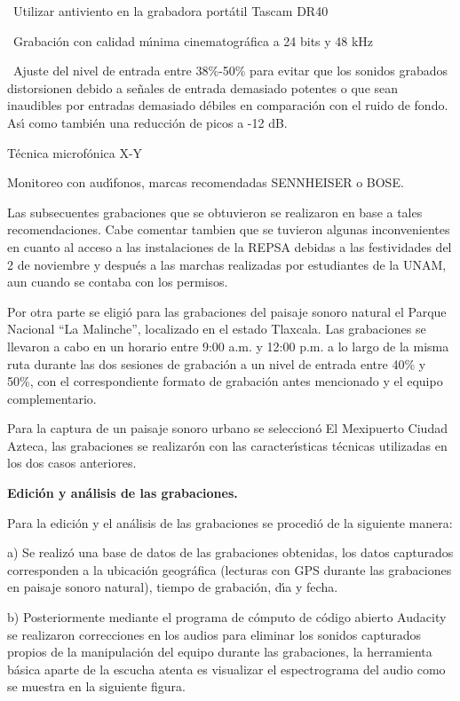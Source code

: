 \textbullet\ Utilizar antiviento en la grabadora port\'{a}til Tascam DR40

\textbullet\ Grabaci\'{o}n con calidad m\'{\i}nima cinematogr\'{a}fica a 24
bits y 48 kHz

\bigskip\textbullet\ Ajuste del nivel de entrada entre 38\%-50\% para evitar
que los sonidos grabados distorsionen debido a se\~{n}ales de entrada
demasiado potentes o que sean inaudibles por entradas demasiado d\'{e}biles en
comparaci\'{o}n con el ruido de fondo. As\'{\i} como tambi\'{e}n una
reducci\'{o}n de picos a -12 dB.

\qquad\textbullet\qquad T\'{e}cnica microf\'{o}nica X-Y

\qquad\textbullet\qquad Monitoreo con aud\'{\i}fonos, marcas recomendadas
SENNHEISER o BOSE.

Las subsecuentes grabaciones que se obtuvieron se realizaron en base a tales
recomendaciones. Cabe comentar tambien que se tuvieron algunas inconvenientes
en cuanto al acceso a las instalaciones de la REPSA debidas a las festividades
del 2 de noviembre y despu\'{e}s a las marchas realizadas por estudiantes de
la UNAM, aun cuando se contaba con los permisos.

Por otra parte se eligi\'{o} para las grabaciones del paisaje sonoro natural
el Parque Nacional \textquotedblleft La Malinche\textquotedblright, localizado
en el estado Tlaxcala. Las grabaciones se llevaron a cabo en un horario entre
9:00 a.m. y 12:00 p.m. a lo largo de la misma ruta durante las dos sesiones de
grabaci\'{o}n a un nivel de entrada entre 40\% y 50\%, con el correspondiente
formato de grabaci\'{o}n antes mencionado y el equipo complementario.

Para la captura de un paisaje sonoro urbano se seleccion\'{o} El Mexipuerto
Ciudad Azteca, las grabaciones se realizar\'{o}n con las caracter\'{\i}sticas
t\'{e}cnicas utilizadas en los dos casos anteriores.

\textbf{ Edici\'{o}n y an\'{a}lisis de las grabaciones.}

Para la edici\'{o}n y el an\'{a}lisis de las grabaciones se procedi\'{o} de la
siguiente manera:

\qquad a) Se realiz\'{o} una base de datos de las grabaciones obtenidas, los
datos capturados corresponden a la ubicaci\'{o}n geogr\'{a}fica (lecturas con
GPS durante las grabaciones en paisaje sonoro natural), tiempo de
grabaci\'{o}n, d\'{\i}a y fecha.

\qquad b) Posteriormente mediante el programa de c\'{o}mputo de c\'{o}digo
abierto Audacity se realizaron correcciones en los audios para eliminar los
sonidos capturados propios de la manipulaci\'{o}n del equipo durante las
grabaciones, la herramienta b\'{a}sica aparte de la escucha atenta es
visualizar el espectrograma del audio como se muestra en la siguiente figura.

